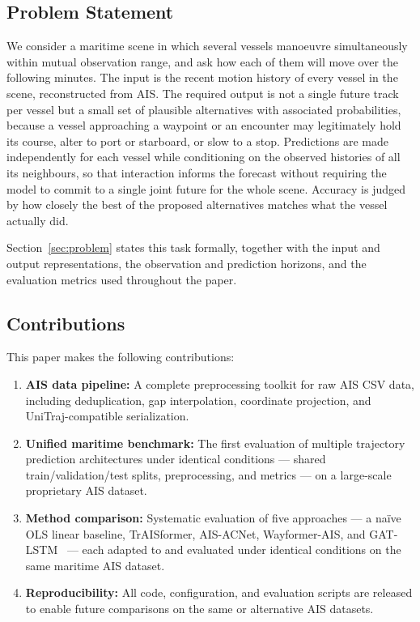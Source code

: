 \documentclass[12pt, a4paper]{article}
\begin{document}
  \subsection{Problem Statement}

  We consider a maritime scene in which several vessels manoeuvre simultaneously
  within mutual observation range, and ask how each of them will move over the
  following minutes.  The input is the recent motion history of every vessel in
  the scene, reconstructed from AIS.  The required output is not a single future
  track per vessel but a small set of plausible alternatives with associated
  probabilities, because a vessel approaching a waypoint or an encounter may
  legitimately hold its course, alter to port or starboard, or slow to a stop.
  Predictions are made independently for each vessel while conditioning on the
  observed histories of all its neighbours, so that interaction informs the
  forecast without requiring the model to commit to a single joint future for
  the whole scene.  Accuracy is judged by how closely the best of the proposed
  alternatives matches what the vessel actually did.

  Section~\ref{sec:problem} states this task formally, together with the input
  and output representations, the observation and prediction horizons, and the
  evaluation metrics used throughout the paper.

  \subsection{Contributions}
  This paper makes the following contributions:
  \begin{enumerate}
      \item \textbf{AIS data pipeline:} A complete preprocessing toolkit for raw AIS CSV data,
      including deduplication, gap interpolation, coordinate projection, and
      UniTraj-compatible serialization.

      \item \textbf{Unified maritime benchmark:} The first evaluation of multiple trajectory
      prediction architectures under identical conditions — shared train/validation/test splits,
      preprocessing, and metrics — on a large-scale proprietary AIS dataset.

      \item \textbf{Method comparison:} Systematic evaluation of five approaches ---
      a na\"{i}ve OLS linear baseline, TrAISformer, AIS-ACNet,
      Wayformer-AIS, and GAT-LSTM~\citep{zhao2023gatlstm} --- each adapted to
      and evaluated under identical conditions on the same maritime AIS dataset.

      \item \textbf{Reproducibility:} All code, configuration, and evaluation scripts
      are released to enable future comparisons on the same or alternative AIS datasets.
  \end{enumerate}
\end{document}
